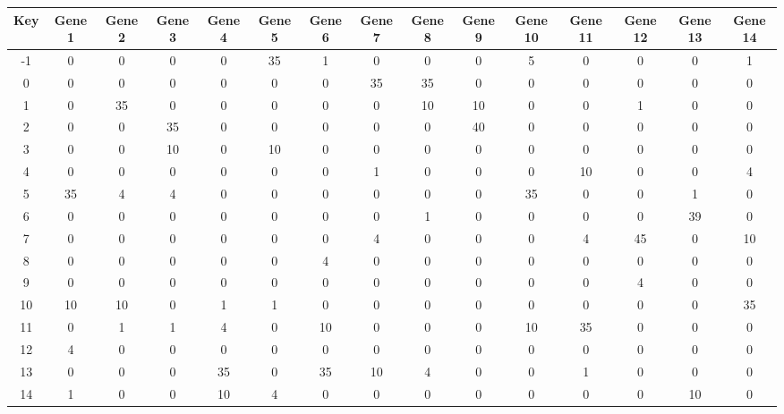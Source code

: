 \begin{tabular}{|c|c|c|c|c|c|c|c|c|c|c|c|c|c|c|}
\hline
Key & Gene 1 & Gene 2 & Gene 3 & Gene 4 & Gene 5 & Gene 6 & Gene 7 & Gene 8 & Gene 9 & Gene 10 & Gene 11 & Gene 12 & Gene 13 & Gene 14 \\
\hline
-1 & 0 & 0 & 0 & 0 & 35 & 1 & 0 & 0 & 0 & 5 & 0 & 0 & 0 & 1 \\
0 & 0 & 0 & 0 & 0 & 0 & 0 & 35 & 35 & 0 & 0 & 0 & 0 & 0 & 0 \\
1 & 0 & 35 & 0 & 0 & 0 & 0 & 0 & 10 & 10 & 0 & 0 & 1 & 0 & 0 \\
2 & 0 & 0 & 35 & 0 & 0 & 0 & 0 & 0 & 40 & 0 & 0 & 0 & 0 & 0 \\
3 & 0 & 0 & 10 & 0 & 10 & 0 & 0 & 0 & 0 & 0 & 0 & 0 & 0 & 0 \\
4 & 0 & 0 & 0 & 0 & 0 & 0 & 1 & 0 & 0 & 0 & 10 & 0 & 0 & 4 \\
5 & 35 & 4 & 4 & 0 & 0 & 0 & 0 & 0 & 0 & 35 & 0 & 0 & 1 & 0 \\
6 & 0 & 0 & 0 & 0 & 0 & 0 & 0 & 1 & 0 & 0 & 0 & 0 & 39 & 0 \\
7 & 0 & 0 & 0 & 0 & 0 & 0 & 4 & 0 & 0 & 0 & 4 & 45 & 0 & 10 \\
8 & 0 & 0 & 0 & 0 & 0 & 4 & 0 & 0 & 0 & 0 & 0 & 0 & 0 & 0 \\
9 & 0 & 0 & 0 & 0 & 0 & 0 & 0 & 0 & 0 & 0 & 0 & 4 & 0 & 0 \\
10 & 10 & 10 & 0 & 1 & 1 & 0 & 0 & 0 & 0 & 0 & 0 & 0 & 0 & 35 \\
11 & 0 & 1 & 1 & 4 & 0 & 10 & 0 & 0 & 0 & 10 & 35 & 0 & 0 & 0 \\
12 & 4 & 0 & 0 & 0 & 0 & 0 & 0 & 0 & 0 & 0 & 0 & 0 & 0 & 0 \\
13 & 0 & 0 & 0 & 35 & 0 & 35 & 10 & 4 & 0 & 0 & 1 & 0 & 0 & 0 \\
14 & 1 & 0 & 0 & 10 & 4 & 0 & 0 & 0 & 0 & 0 & 0 & 0 & 10 & 0 \\
\hline
\end{tabular}